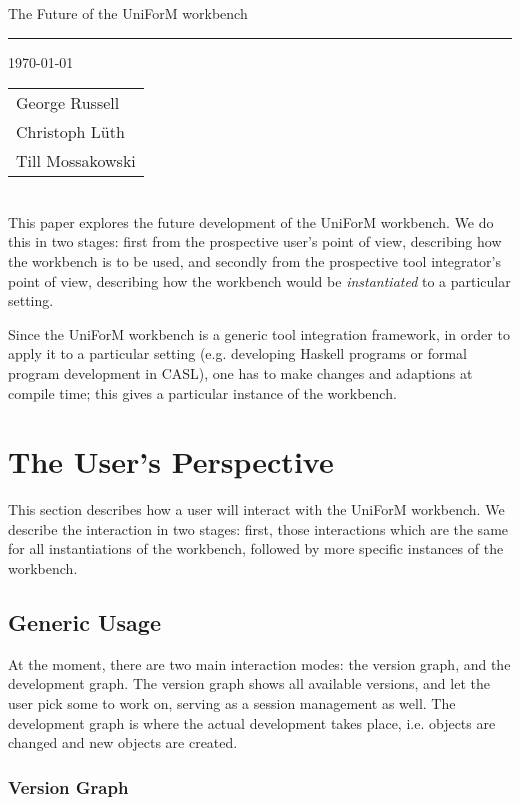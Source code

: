 \documentclass[a4paper]{article}
\begin{document}
{\Large{The Future of the UniForM workbench}}

\rule{\textwidth}{.2pt} 


\today 
\hfill
\begin{tabular}[t]{l}
George Russell \\
Christoph L\"uth \\
Till Mossakowski
\end{tabular}\\[3ex]


This paper explores the future development of the UniForM workbench.
We do this in two stages: first from the prospective user's point of
view, describing how the workbench is to be used, and secondly from
the prospective tool integrator's point of view, describing how the
workbench would be \emph{instantiated} to a particular setting.

Since the UniForM workbench is a generic tool integration framework,
in order to apply it to a particular setting (e.g. developing Haskell
programs or formal program development in CASL), one has to make
changes and adaptions at compile time; this gives a particular
instance of the workbench.


\section{The User's Perspective}

This section describes how a user will interact with the UniForM
workbench. We describe the interaction in two stages: first, those
interactions which are the same for all instantiations of the
workbench, followed by more specific instances of the workbench.


\subsection{Generic Usage}

At the moment, there are two main interaction modes: the version
graph, and the development graph. The version graph shows all
available versions, and let the user pick some to work on, serving as
a session management as well. The development graph is where the
actual development takes place, i.e. objects are changed and new
objects are created. 

\subsubsection{Version Graph}
\end{document}
